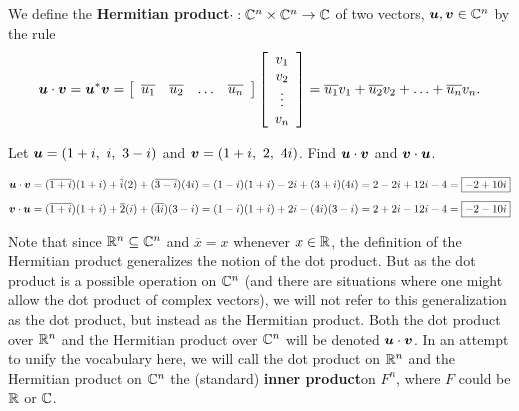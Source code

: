 \begin{Def}
We define the \textbf{Hermitian product}\footnotemark[2] $\cdot : \C^n\times \C^n \to \C$ of two vectors, $\bb u, \bb v \in \C^n$ by the rule
\[\bb u \cdot \bb v = \bb u^* \bb v = \mtx{cccc}{\overline{u_1} & \overline{u_2} & \ldots & \overline{u_n}}\mtx{c}{v_1 \\ v_2 \\ \vdots \\ v_n} = \overline{u_1}v_1 + \overline{u_2}v_2 + \ldots + \overline{u_n}v_n.\]
\end{Def}\vs



\begin{Exam} Let $\bb u = (1+i,\ i,\ 3-i)$ and $\bb v = (1+i,\ 2,\ 4i)$. Find $\bb u\cdot \bb v$ and $\bb v\cdot \bb u$.%

\[\bb u\cdot \bb v = (\overline{1+i})(1+i) + \overline{i}(2) + (\overline{3-i})(4i) = (1-i)(1+i) - 2i + (3+i)(4i) = 2 - 2i + 12i - 4 = \fbox{$-2+10i$}\]
\[\bb v \cdot \bb u = (\overline{1+i})(1+i) + \overline{2}(i) + (\overline{4i})(3-i) = (1-i)(1+i) + 2i - (4i)(3-i) = 2 + 2i - 12i - 4 = \fbox{$-2 - 10i$}\]
\end{Exam}\vs

Note that since $\R^n\subseteq \C^n$ and $\overline{x} = x$ whenever $x\in \R$, the definition of the Hermitian product generalizes the notion of the dot product. But as the dot product is a possible operation on $\C^n$ (and there are situations where one might allow the dot product of complex vectors), we will not refer to this generalization as the dot product, but instead as the Hermitian product. Both the dot product over $\R^n$ and the Hermitian product over $\C^n$ will be denoted $\bb u \cdot \bb v$. In an attempt to unify the vocabulary here, we will call the dot product on $\R^n$ and the Hermitian product on $\C^n$ the (standard) \textbf{inner product}\footnotemark[8] on $F^n$, where $F$ could be $\R$ or $\C$. \\

